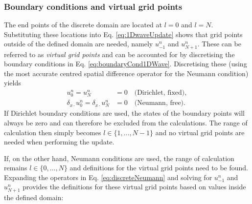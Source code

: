 \subsubsection{Boundary conditions and virtual grid points}
The end points of the discrete domain are located at $l = 0$ and $l = N$.
Substituting these locations into Eq. \eqref{eq:1DwaveUpdate} shows that grid points outside of the defined domain are needed, namely $u_{-1}^n$ and $u_{N+1}^n$. These can be referred to as \textit{virtual grid points} and can be accounted for %
by discretising the boundary conditions in Eq. \eqref{eq:boundaryCond1DWave}. Discretising these (using the most accurate centred spatial difference operator for the Neumann condition) yields
\begin{subequations}
    \begin{align}
        u_0^n = u_N^n &= 0 \quad\text{(Dirichlet, fixed)}\label{eq:discreteDirichlet},\\
        \delta_{x\cdot} u_0^n = \delta_{x\cdot} u_N^n &= 0 \quad \text{(Neumann, free)}.\label{eq:discreteNeumann}
    \end{align}
\end{subequations}
If Dirichlet boundary conditions are used, the states of the boundary points will always be zero and can therefore be excluded from the calculations. The range of calculation then simply becomes $l\in\{1,\hdots, N-1\}$ and no virtual grid points are needed when performing the update.

If, on the other hand, Neumann conditions are used, the range of calculation remains $l\in\{0,\hdots, N\}$ and definitions for the virtual grid points need to be found.
Expanding the operators in Eq. \eqref{eq:discreteNeumann} and solving for $u_{-1}^n$ and $u_{N+1}^n$ provides the definitions for these virtual grid points based on values inside the defined domain:

